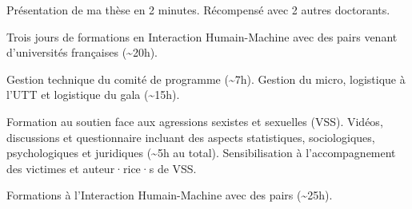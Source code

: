\documentclass[10pt,a4paper,ragged2e,withhyper]{altacv}
\begin{document}
\begin{paracol}{2}
\divider

Présentation de ma thèse en 2 minutes. Récompensé avec 2 autres doctorants.

\divider

Trois jours de formations en Interaction Humain-Machine avec des pairs venant d’universités françaises (\textasciitilde20h).

\divider

Gestion technique du comité de programme (\textasciitilde7h).
Gestion du micro, logistique à l’UTT et logistique du gala (\textasciitilde15h).


\newpage

Formation au soutien face aux agressions sexistes et sexuelles (VSS). Vidéos, discussions et questionnaire incluant des aspects statistiques, sociologiques, psychologiques et juridiques (\textasciitilde5h au total). Sensibilisation à l'accompagnement des victimes et auteur·rice·s de VSS.


\divider

Formations à l’Interaction Humain-Machine avec des pairs (\textasciitilde25h).








\end{paracol}
\end{document}
